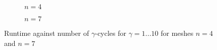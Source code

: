 \documentclass[11pt,a4paper]{article}
\begin{document}
\begin{figure}[h!]
	\centering
	\begin{subfigure}[h!]{.49\textwidth}
		\begin{center}
			\resizebox{0.52\width}{!}{}
			\caption{$n=4$}
			\label{fig::TimGamma1}
		\end{center}	
	\end{subfigure}
	\hfill
	\begin{subfigure}[h!]{.49\textwidth}
		\centering
		\resizebox{0.52\width}{!}{}
		\caption{$n=7$}
		\label{fig::TimGamma2}
	\end{subfigure}
	\label{fig::TimGamma}
	\caption{Runtime against number of $\gamma$-cycles for $\gamma = 1...10 $ for meshes $n=4$ and $n=7$ }
\end{figure}




%
%
\end{document}
